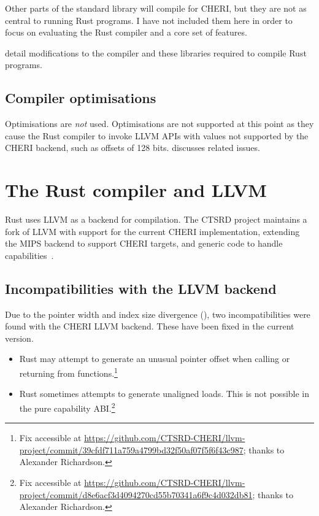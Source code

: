\documentclass[dissertation.tex]{subfiles}
\begin{document}
Other parts of the standard library will compile for CHERI, but they are
not as central to running Rust programs.
I have not included them here in order to focus on evaluating the Rust
compiler and a core set of features.

 detail modifications to
the compiler and these libraries required to compile Rust programs.

\subsection{Compiler optimisations}
Optimisations are \emph{not} used.
Optimisations are not supported at this point as they cause the Rust
compiler to invoke LLVM APIs with values not supported by the CHERI
backend, such as offsets of 128 bits.
 discusses related issues.


\section{The Rust compiler and LLVM}
\label{sec:impl-rustllvm}

Rust uses LLVM as a backend for compilation.
The CTSRD project maintains a fork of LLVM with support for the
current CHERI implementation, extending the MIPS backend to
support CHERI targets, and generic code to handle
capabilities~\cite{cheri-prog-guide}.

\subsection{Incompatibilities with the LLVM backend}
Due to the pointer width and index size divergence
(), two incompatibilities were found with the CHERI
LLVM backend.
These have been fixed in the current version.

\begin{itemize}
    \item Rust may attempt to generate an unusual pointer offset when
    calling or returning from functions.\footnote{Fix accessible at
    \url{https://github.com/CTSRD-CHERI/llvm-project/commit/39cfdf711a759a4799bd32f50af07f5f6f43c987};
    thanks to Alexander Richardson.}
    \item Rust sometimes attempts to generate unaligned loads.
    This is not possible in the pure capability ABI.\footnote{Fix
    accessible at
    \url{https://github.com/CTSRD-CHERI/llvm-project/commit/d8e6acf3d4094270cd55b70341a6f9c4d032db81};
    thanks to Alexander Richardson.}
\end{itemize}
\end{document}
